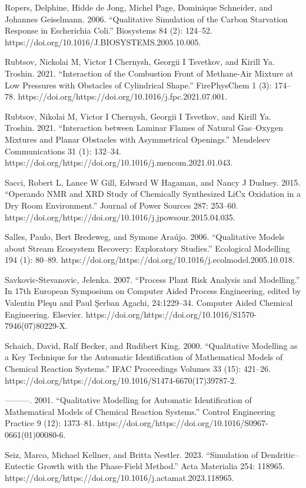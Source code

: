 \documentclass[utf8]{gradu3}
\begin{document}
Ropers, Delphine, Hidde de Jong, Michel Page, Dominique Schneider, and Johannes Geiselmann. 2006. “Qualitative Simulation of the Carbon Starvation Response in Escherichia Coli.” Biosystems 84 (2): 124–52. https://doi.org/10.1016/J.BIOSYSTEMS.2005.10.005.

Rubtsov, Nickolai M, Victor I Chernysh, Georgii I Tsvetkov, and Kirill Ya. Troshin. 2021. “Interaction of the Combustion Front of Methane-Air Mixture at Low Pressures with Obstacles of Cylindrical Shape.” FirePhysChem 1 (3): 174–78. https://doi.org/https://doi.org/10.1016/j.fpc.2021.07.001.

Rubtsov, Nikolai M, Victor I Chernysh, Georgii I Tsvetkov, and Kirill Ya. Troshin. 2021. “Interaction between Laminar Flames of Natural Gas–Oxygen Mixtures and Planar Obstacles with Asymmetrical Openings.” Mendeleev Communications 31 (1): 132–34. https://doi.org/https://doi.org/10.1016/j.mencom.2021.01.043.

Sacci, Robert L, Lance W Gill, Edward W Hagaman, and Nancy J Dudney. 2015. “Operando NMR and XRD Study of Chemically Synthesized LiCx Oxidation in a Dry Room Environment.” Journal of Power Sources 287: 253–60. https://doi.org/https://doi.org/10.1016/j.jpowsour.2015.04.035.

Salles, Paulo, Bert Bredeweg, and Symone Araújo. 2006. “Qualitative Models about Stream Ecosystem Recovery: Exploratory Studies.” Ecological Modelling 194 (1): 80–89. https://doi.org/https://doi.org/10.1016/j.ecolmodel.2005.10.018.

Savkovic-Stevanovic, Jelenka. 2007. “Process Plant Risk Analysis and Modelling.” In 17th European Symposium on Computer Aided Process Engineering, edited by Valentin Pleşu and Paul Şerban Agachi, 24:1229–34. Computer Aided Chemical Engineering. Elsevier. https://doi.org/https://doi.org/10.1016/S1570-7946(07)80229-X.

Schaich, David, Ralf Becker, and Rudibert King. 2000. “Qualitative Modelling as a Key Technique for the Automatic Identification of Mathematical Models of Chemical Reaction Systems.” IFAC Proceedings Volumes 33 (15): 421–26. https://doi.org/https://doi.org/10.1016/S1474-6670(17)39787-2.

———. 2001. “Qualitative Modelling for Automatic Identification of Mathematical Models of Chemical Reaction Systems.” Control Engineering Practice 9 (12): 1373–81. https://doi.org/https://doi.org/10.1016/S0967-0661(01)00080-6.

Seiz, Marco, Michael Kellner, and Britta Nestler. 2023. “Simulation of Dendritic–Eutectic Growth with the Phase-Field Method.” Acta Materialia 254: 118965. https://doi.org/https://doi.org/10.1016/j.actamat.2023.118965.
\end{document}
